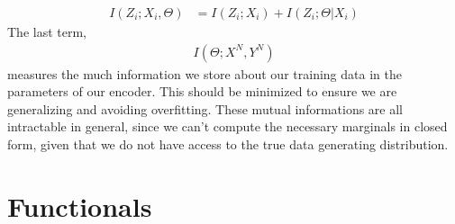 \documentclass[book.tex]{subfiles}
\begin{document}
\begin{align}
I(Z_i;X_i,\Theta) &=I(Z_i;X_i) + I(Z_i;\Theta|X_i)
\end{align}
The last term, 
\begin{align}I(\Theta;X^N,Y^N)\end{align}
\noindent measures the much information we store about our training data in the parameters of our encoder. This should be minimized to ensure we are generalizing and avoiding overfitting. These mutual informations are all intractable in general, since we can't compute the necessary marginals in closed form, given that we do not have access to the true data generating distribution.

\section{Functionals}
\end{document}
